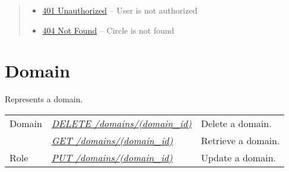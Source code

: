 \documentclass[letterpaper,10pt,english]{sphinxmanual}
\begin{document}
\begin{fulllineitems}
\begin{quote}
\begin{description}
\begin{itemize}
\item {} 
\href{http://www.w3.org/Protocols/rfc2616/rfc2616-sec10.html\#sec10.4.2}{401 Unauthorized} -- User is not authorized

\item {} 
\href{http://www.w3.org/Protocols/rfc2616/rfc2616-sec10.html\#sec10.4.5}{404 Not Found} -- Circle is not found

\end{itemize}

\end{description}\end{quote}

\end{fulllineitems}



\section{Domain}
\label{\detokenize{resources/domain:domain}}\label{\detokenize{resources/domain::doc}}\label{\detokenize{resources/domain:id1}}
Represents a domain.

\noindent\begin{tabulary}{\linewidth}{|L|L|L|}
\hline
{}\relax &\relax &\relax \\
\hline
Domain
&
{\hyperref[\detokenize{resources/domain:delete--domains-(domain_id)}]{\emph{DELETE /domains/(domain\_id)}}}
&
Delete a domain.
\\
\hline&
{\hyperref[\detokenize{resources/domain:get--domains-(domain_id)}]{\emph{GET /domains/(domain\_id)}}}
&
Retrieve a domain.
\\
\hline
Role
&
{\hyperref[\detokenize{resources/domain:put--domains-(domain_id)}]{\emph{PUT /domains/(domain\_id)}}}
&
Update a domain.
\\
\hline\end{tabulary}


\begin{DUlineblock}{0em}
\item[] 
\end{DUlineblock}
\end{document}
